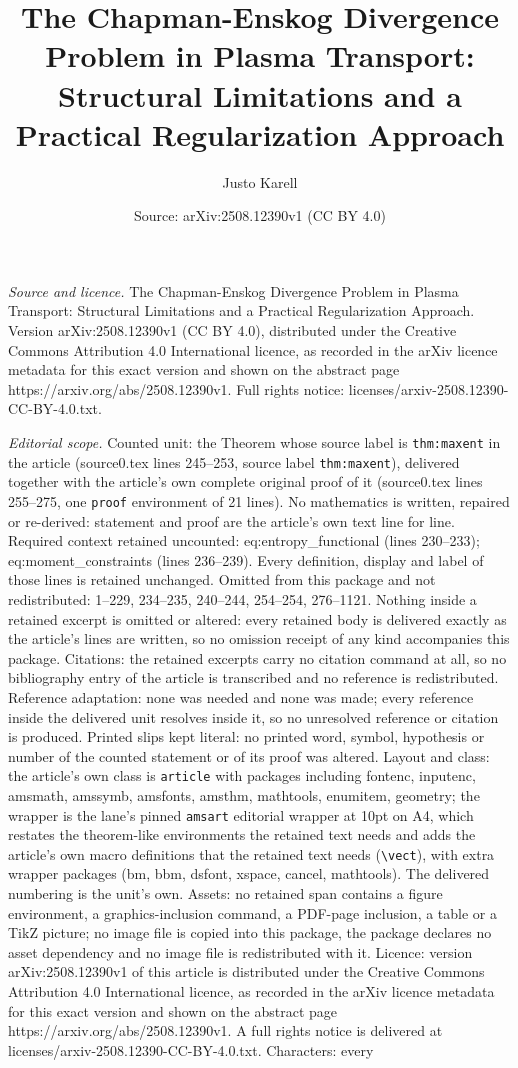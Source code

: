 \documentclass[10pt,a4paper]{amsart}
\title[The Chapman-Enskog Divergence Problem in Plasma Transport: S]{The Chapman-Enskog Divergence Problem in Plasma Transport: Structural Limitations and a Practical Regularization Approach}
\author{Justo Karell}
\date{Source: arXiv:2508.12390v1 (CC BY 4.0)}
\begin{document}
\maketitle

\noindent\emph{Source and licence.} The Chapman-Enskog Divergence Problem in Plasma Transport: Structural Limitations and a Practical Regularization Approach. Version arXiv:2508.12390v1 (CC BY 4.0), distributed under the Creative Commons Attribution 4.0 International licence, as recorded in the arXiv licence metadata for this exact version and shown on the abstract page https://arxiv.org/abs/2508.12390v1. Full rights notice: licenses/arxiv-2508.12390-CC-BY-4.0.txt.\par\smallskip

\noindent\textit{Editorial scope.} Counted unit: the Theorem whose source label is \texttt{thm:maxent} in the article (source0.tex lines 245--253, source label \texttt{thm:maxent}), delivered together with the article's own complete original proof of it (source0.tex lines 255--275, one \texttt{proof} environment of 21 lines). No mathematics is written, repaired or re-derived: statement and proof are the article's own text line for line. Required context retained uncounted: eq:entropy\_functional (lines 230--233); eq:moment\_constraints (lines 236--239). Every definition, display and label of those lines is retained unchanged. Omitted from this package and not redistributed: 1--229, 234--235, 240--244, 254--254, 276--1121. Nothing inside a retained excerpt is omitted or altered: every retained body is delivered exactly as the article's lines are written, so no omission receipt of any kind accompanies this package. Citations: the retained excerpts carry no citation command at all, so no bibliography entry of the article is transcribed and no reference is redistributed. Reference adaptation: none was needed and none was made; every reference inside the delivered unit resolves inside it, so no unresolved reference or citation is produced. Printed slips kept literal: no printed word, symbol, hypothesis or number of the counted statement or of its proof was altered. Layout and class: the article's own class is \texttt{article} with packages including fontenc, inputenc, amsmath, amssymb, amsfonts, amsthm, mathtools, enumitem, geometry; the wrapper is the lane's pinned \texttt{amsart} editorial wrapper at 10pt on A4, which restates the theorem-like environments the retained text needs and adds the article's own macro definitions that the retained text needs (\texttt{\textbackslash vect}), with extra wrapper packages (bm, bbm, dsfont, xspace, cancel, mathtools). The delivered numbering is the unit's own. Assets: no retained span contains a figure environment, a graphics-inclusion command, a PDF-page inclusion, a table or a TikZ picture; no image file is copied into this package, the package declares no asset dependency and no image file is redistributed with it. Licence: version arXiv:2508.12390v1 of this article is distributed under the Creative Commons Attribution 4.0 International licence, as recorded in the arXiv licence metadata for this exact version and shown on the abstract page https://arxiv.org/abs/2508.12390v1. A full rights notice is delivered at licenses/arxiv-2508.12390-CC-BY-4.0.txt. Characters: every 
\end{document}
